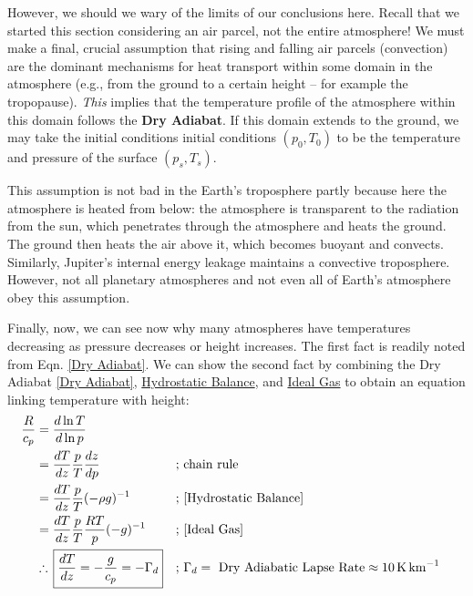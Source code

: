 However, we should we wary of the limits of our conclusions here. Recall that we started this section considering an air parcel, not the entire atmosphere! We must make a final, crucial assumption that rising and falling air parcels (convection) are the dominant mechanisms for heat transport within some domain in the atmosphere (e.g., from the ground to a certain height – for example the tropopause). \textit{This} implies that the temperature profile of the atmosphere within this domain follows the \textbf{Dry Adiabat}. If this domain extends to the ground, we may take the initial conditions initial conditions $(p_0,T_0)$ to be the temperature and pressure of the surface $(p_s,T_s)$.

This assumption is not bad in the Earth's troposphere partly because here the atmosphere is heated from below: the atmosphere is transparent to the radiation from the sun, which penetrates through the atmosphere and heats the ground. The ground then heats the air above it, which becomes buoyant and convects. Similarly, Jupiter's internal energy leakage maintains a convective troposphere. However, not all planetary atmospheres and not even all of Earth's atmosphere obey this assumption.

Finally, now, we can see now why many atmospheres have temperatures decreasing as pressure decreases or height increases. The first fact is readily noted from Eqn. \ref{Dry Adiabat}. We can show the second fact by combining the Dry Adiabat \ref{Dry Adiabat}, \hyperref[Hydrostatic Balance]{Hydrostatic Balance}, and \hyperref[Ideal Gas]{Ideal Gas} to obtain an equation linking temperature with height:
\begin{align*}
    \frac{R}{c_p}&=\frac{d\ln T}{d\ln p}
    \\
    &=\frac{d T}{d z}\frac{p}{T}\frac{dz}{d p}
    &\text{; }& \text{chain rule}\\
    &=\frac{d T}{d z}\frac{p}{T}(-\rho g)^{-1} 
    &\text{; }& \text{\ref{Hydrostatic Balance}}
    \\
    &=\frac{d T}{d z}\frac{p}{T}\frac{RT}{p}(- g)^{-1}
    &\text{; }& \text{\ref{Ideal Gas}}
    \\
    &\therefore\,
    \boxed{\frac{dT}{dz}=-\frac{g}{c_p} = -\Gamma_d} &\text{; }& \Gamma_d=\text{ Dry Adiabatic Lapse Rate}\approx\text{\qty{10}{\kelvin\per\kilo\metre}}
\end{align*}

